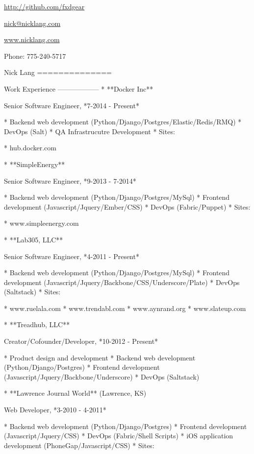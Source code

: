 \begin{nospace}\begin{flushright}
\href{http://github.com/fxdgear}{http://github.com/fxdgear}

\href{mailto:nick@nicklang.com}{nick@nicklang.com}

\href{http://www.nicklang.com}{www.nicklang.com}

Phone: 775-240-5717
\end{flushright}\end{nospace}
Nick Lang
==============

Work Experience
------------------
*   **Docker Inc**

    Senior Software Engineer, *7-2014 - Present*

    *   Backend web development (Python/Django/Postgres/Elastic/Redis/RMQ)
    *   DevOps (Salt)
    *   QA Infrastrucutre Development
    *   Sites:

        *   hub.docker.com

*   **SimpleEnergy**

    Senior Software Engineer, *9-2013 - 7-2014*

    *   Backend web development (Python/Django/Postgres/MySql)
    *   Frontend development (Javascript/Jquery/Ember/CSS)
    *   DevOps (Fabric/Puppet)
    *   Sites:

        *   www.simpleenergy.com

*   **Lab305, LLC**

    Senior Software Engineer, *4-2011 - Present*

    *   Backend web development (Python/Django/Postgres/MySql)
    *   Frontend development (Javascript/Jquery/Backbone/CSS/Underscore/Plate)
    *   DevOps (Saltstack)
    *   Sites:

        *   www.ruelala.com
        *   www.trendabl.com
        *   www.aynrand.org
        *   www.slateup.com

*   **Treadhub, LLC**

    Creator/Cofounder/Developer, *10-2012 - Present*

    *   Product design and development
    *   Backend web development (Python/Django/Postgres)
    *   Frontend development (Javascript/Jquery/Backbone/Underscore)
    *   DevOps (Saltstack)

*   **Lawrence Journal World** (Lawrence, KS)

    Web Developer, *3-2010 - 4-2011*

    *   Backend web development (Python/Django/Postgres)
    *   Frontend development (Javascript/Jquery/CSS)
    *   DevOps (Fabric/Shell Scripts)
    *   iOS application development (PhoneGap/Javascript/CSS)
    *   Sites:

